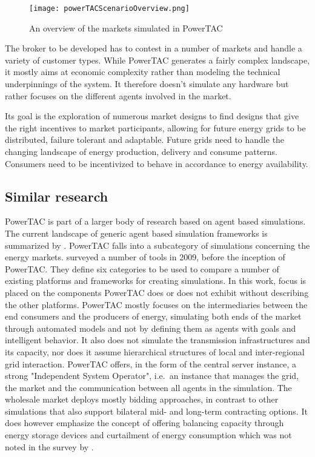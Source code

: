 \begin{figure}[h]%
    \texttt{[image: powerTACScenarioOverview.png]}
    \caption{An overview of the markets simulated in PowerTAC}
    \label{fig:powertacoverview}
\end{figure}


The broker to be developed has to contest in a number of markets and handle a variety of customer types. While
\ac{PowerTAC} generates a fairly complex landscape, it mostly aims at economic complexity rather than
modeling the technical underpinnings of the system. It therefore doesn't simulate any hardware but rather focuses on the
different agents involved in the market.

Its goal is the exploration of numerous market designs to find designs that give the right incentives to market
participants, allowing for future energy grids to be distributed, failure tolerant and adaptable. Future grids need to handle the
changing landscape of energy production, delivery and consume patterns. Consumers need to be incentivized to behave in
accordance to energy availability.

\subsection{Similar research}%
\label{sub:similar_research}

\ac{PowerTAC} is part of a larger body of research based on agent based simulations. The current landscape of generic
agent based simulation frameworks is summarized by \citet{abar2017agent}. \ac{PowerTAC} falls into a subcategory of
simulations concerning the energy markets. \citet{zhou2007agent} surveyed a number of tools in 2009, before the
inception of \ac{PowerTAC}. They define six categories to be used to compare a number of existing platforms and
frameworks for creating simulations. In this work, focus is placed on the components \ac{PowerTAC} does or does not
exhibit without describing the other platforms. \ac{PowerTAC} mostly focuses on the intermediaries between the end
consumers and the producers of energy, simulating both ends of the market through automated models and not by defining
them as agents with goals and intelligent behavior. It also does not simulate the transmission infrastructures and its
capacity, nor does it assume hierarchical structures of local and inter-regional grid interaction. \ac{PowerTAC} offers,
in the form of the central server instance, a strong "Independent System Operator", i.e.\ an instance that manages the
grid, the market and the communication between all agents in the simulation. The wholesale market deploys mostly
bidding approaches, in contrast to other simulations that also support bilateral mid- and long-term contracting options.
It does however emphasize the concept of offering balancing capacity through energy storage devices and curtailment of
energy consumption which was not noted in the survey by \citet{zhou2007agent}.

